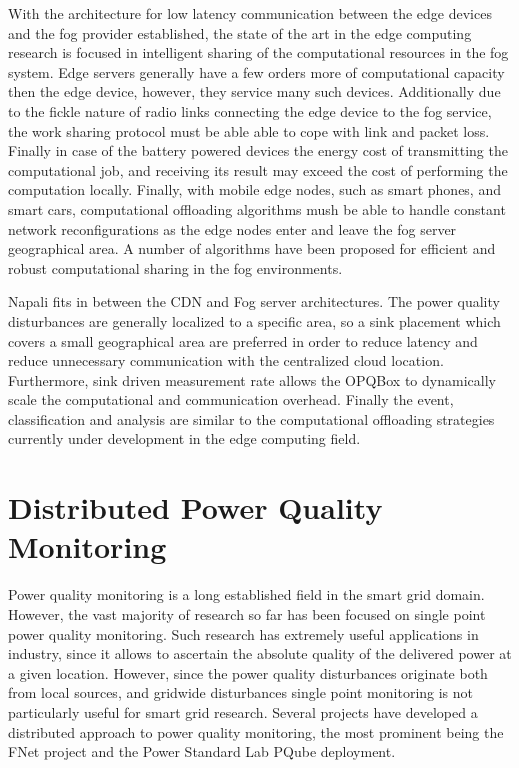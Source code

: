 With the architecture for low latency communication between the edge devices and the fog provider established, the state of the art in the edge computing research is focused in intelligent sharing of the computational resources in the fog system. Edge servers generally have a few orders more of computational capacity then the edge device, however, they service many such devices. Additionally due to the fickle nature of radio links connecting the edge device to the fog service, the work sharing protocol must be able able to cope with link and packet loss. Finally in case of the battery powered devices the energy cost of transmitting the computational job, and receiving its result may exceed the cost of performing the computation locally. Finally, with mobile edge nodes, such as smart phones, and smart cars, computational offloading algorithms mush be able to handle constant network reconfigurations as the edge nodes enter and leave the fog server geographical area. A number of algorithms have been proposed for efficient and robust computational sharing in the fog environments. \cite{oueis2015fog} \cite{wang2015mobiscud} \cite{wang2013mobile}

Napali fits in between the CDN and Fog server architectures. The power quality disturbances are generally localized to a specific area, so a sink placement which covers a small geographical area are preferred in order to reduce latency and reduce unnecessary communication with the centralized cloud location. Furthermore, sink driven measurement rate allows the OPQBox to dynamically scale the computational and communication overhead. Finally the event, classification and analysis are similar to the computational offloading strategies currently under development in the edge computing field.

\section{Distributed Power Quality Monitoring}

Power quality monitoring is a long established field in the smart grid domain. However, the vast majority of research so far has been focused on single point power quality monitoring.\cite{silva2017development} Such research has extremely useful applications in industry, since it allows to ascertain the absolute quality of the delivered power at a given location. However, since the power quality disturbances originate both from local sources, and gridwide disturbances single point monitoring is not particularly useful for smart grid research. Several projects have developed a distributed approach to power quality monitoring, the most prominent being the FNet project and the Power Standard Lab PQube deployment. 

